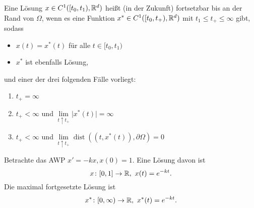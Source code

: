 \begin{defi}
	Eine Lösung $x \in C^1 ( [t_0,t_1 ),\mathbb R^d )$ heißt (in der Zukunft) fortsetzbar bis an der Rand von $\Omega$, wenn es eine Funktion $x^* \in C^1 ([t_0,t_+ ),\mathbb R^d )$ mit $t_1 \leq t_+ \leq \infty$ gibt, sodass
	\begin{itemize}
		\item $x(t)=x^*(t)$ für alle $t \in [t_0,t_1)$
		\item $x^*$ ist ebenfalls Lösung,
	\end{itemize}
	und einer der drei folgenden Fälle vorliegt:
	\begin{enumerate}[nolistsep]
		\item $t_+=\infty$
		\item $t_+<\infty$ und $\lim\limits_{t \uparrow t_+} \vert x^*(t) \vert =\infty$
		\item $t_+<\infty$ und $\lim\limits_{t \uparrow t_+} \operatorname{dist} ( (t,x^*(t) ), \partial \Omega )=0$
	\end{enumerate}
\end{defi}

\begin{bsp}[Fortsetzbarkeit]
	Betrachte das AWP $x' =-kx,x(0)=1$.  Eine Lösung davon ist
	\begin{equation*}
		x \colon [0,1] \to \mathbb R,\  x(t)=e^{-kt}.
	\end{equation*}
	Die maximal fortgesetzte Lösung ist
	\begin{equation*}
		x^* \colon [0,\infty) \to \R,\ x^*(t)=e^{-kt}.
	\end{equation*}
\end{bsp}


